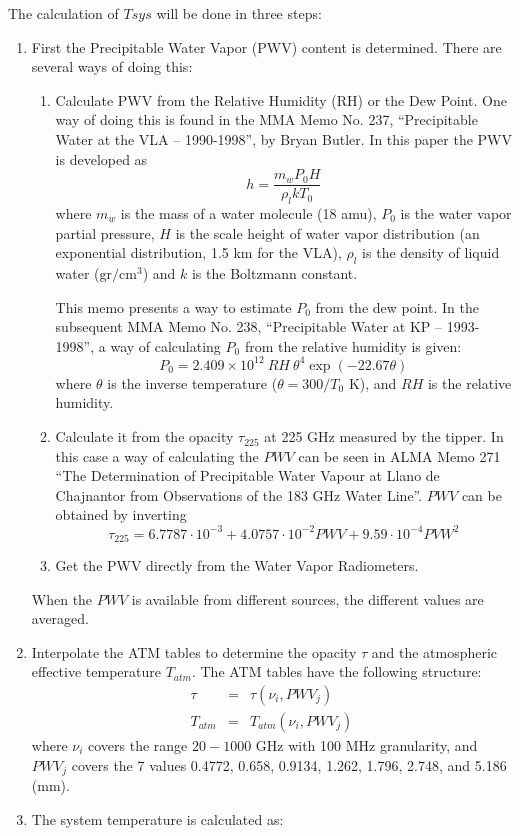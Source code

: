 The calculation of $Tsys$ will be done in three steps:
\begin{enumerate}
\item First the Precipitable Water Vapor (PWV) content is determined. There are
several ways of doing this:
\begin{enumerate}
\item Calculate PWV from the Relative Humidity (RH) or the Dew Point. One way
of doing this is found in the MMA Memo No. 237, ``Precipitable Water at the VLA --
1990-1998'', by Bryan Butler. In this paper the PWV is developed as
$$
h = \frac{m_w P_0 H}{\rho_l k T_0}
$$
where $m_w$ is the mass of a water molecule (18 amu), $P_0$ is the water vapor
partial pressure, $H$ is the scale height of water vapor distribution (an
exponential distribution, 1.5 km for the VLA), $\rho_l$ is the density of
liquid water ($\mathrm{gr}/\mathrm{cm}^3$) and $k$ is the Boltzmann constant.

This memo presents a way to estimate $P_0$ from the dew point. In the subsequent
MMA Memo No. 238, ``Precipitable Water at KP -- 1993-1998'', a way of calculating
$P_0$ from the relative humidity is given:
$$
P_0 = 2.409 \times 10^{12} \ RH\ \theta^4 \exp(-22.67\theta)
$$
where $\theta$ is the inverse temperature ($\theta = 300/T_0 $ K), and $RH$ is
the relative humidity.

\item Calculate it from the opacity $\tau_{225}$ at 225 GHz measured by the
tipper. In this case a way of calculating the $PWV$ can be seen in
ALMA Memo 271 ``The Determination of Precipitable Water Vapour at Llano de
Chajnantor from Observations of the 183 GHz Water Line''. $PWV$ can be obtained
by inverting
$$
\tau_{225} = 6.7787\cdot 10^{-3} + 4.0757\cdot 10^{-2} PWV + 9.59\cdot 10^{-4} PVW^2
$$
\item Get the PWV directly from the Water Vapor Radiometers.
\end{enumerate}
When the $PWV$ is available from different sources, the different values
are averaged.

\item Interpolate the ATM tables to determine the opacity $\tau$ and the
atmospheric effective temperature $T_{atm}$. The ATM tables have the following structure:
\begin{eqnarray*}
\tau & = & \tau(\nu_i, PWV_j) \\
T_{atm} & = & T_{atm}(\nu_i, PWV_j)
\end{eqnarray*}
where $\nu_i$ covers the range $20-1000$ GHz with 100 MHz granularity, and $PWV_j$
covers the 7 values 0.4772, 0.658, 0.9134, 1.262, 1.796, 2.748, and 5.186 (mm). 
\item The system temperature is calculated as:


\end{enumerate}
